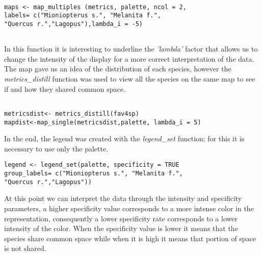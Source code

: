 \documentclass[12pt,a4paper]{article}
\begin{document}
\begin{lstlisting}

maps <- map_multiples (metrics, palette, ncol = 2,
labels= c("Mioniopterus s.", "Melanita f.",
"Quercus r.","Lagopus"),lambda_i = -5)


\end{lstlisting}
\bigskip
In this function it is interesting to underline the \textit{'lambda'} factor that allows us to change the intensity of the display for a more correct interpretation of the data.\\
The map gave us an idea of the distribution of each species, however the \textit{metrics\_distill} function was used to view all the species on the same map to see if and how they shared common space.
\begin{lstlisting}

metricsdist<- metrics_distill(fav4sp)
mapdist<-map_single(metricsdist,palette, lambda_i = 5)

\end{lstlisting}
\bigskip
In the end, the legend was created with the \textit{legend\_set} function; for this it is necessary to use only the palette.
\\
\begin{lstlisting}
legend <- legend_set(palette, specificity = TRUE
group_labels= c("Mioniopterus s.", "Melanita f.",
"Quercus r.","Lagopus"))

\end{lstlisting}
\bigskip
At this point we can interpret the data through the intensity and specificity parameters, a higher specificity value corresponds to a more intense color in the representation, consequently a lower specificity rate corresponds to a lower intensity of the color.
When the specificity value is lower it means that the species share common space while when it is high it means that portion of space is not shared.
\end{document}
